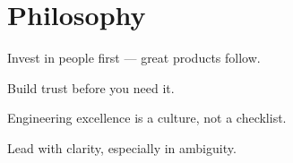 \documentclass[9pt,a4paper]{article}
\begin{document}
\begin{minipage}[t]{0.285\textwidth}
\vspace{5pt}
\section{Philosophy}
\vspace{2pt}
{\footnotesize\color{soft}
Invest in people first ---\newline
great products follow.\par\vspace{3pt}
Build trust before you need it.\par\vspace{3pt}
Engineering excellence is a\newline
culture, not a checklist.\par\vspace{3pt}
Lead with clarity,\newline
especially in ambiguity.%
}

\end{minipage}%
\hfill%
\end{document}
